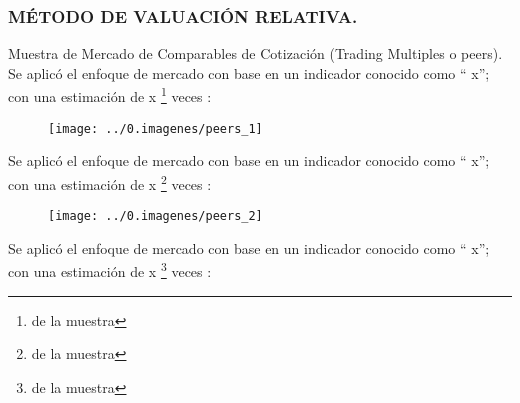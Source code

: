 %


\subsubsection{M\'ETODO DE VALUACI\'ON RELATIVA.}

\textcolor{principal}{Muestra de Mercado de Comparables de Cotizaci\'on (Trading Multiples o \gls{peers})}. Se aplic\'o el enfoque de mercado con base en un indicador conocido como ``\textcolor{principal}{\peersa} x''; con una estimaci\'on de \textcolor{principal}{\peersaMult x} \footnote{\peersaEst{} de la muestra} veces \peersaTo:\\



\begin{figure}[H]
\centering
\texttt{[image: ../0.imagenes/peers\_1]}
\end{figure}

\newpage
Se aplic\'o el enfoque de mercado con base en un indicador conocido como ``\textcolor{principal}{\peersb} x''; con una estimaci\'on de \textcolor{principal}{\peersbMult x} \footnote{\peersbEst{} de la muestra} veces \peersbTo:\\

\begin{figure}[H]
\centering
\texttt{[image: ../0.imagenes/peers\_2]}
\end{figure}

\newpage

Se aplic\'o el enfoque de mercado con base en un indicador conocido como ``\textcolor{principal}{\peersc} x''; con una estimaci\'on de \textcolor{principal}{\peerscMult x} \footnote{\peerscEst{} de la muestra} veces \peerscTo:\\

